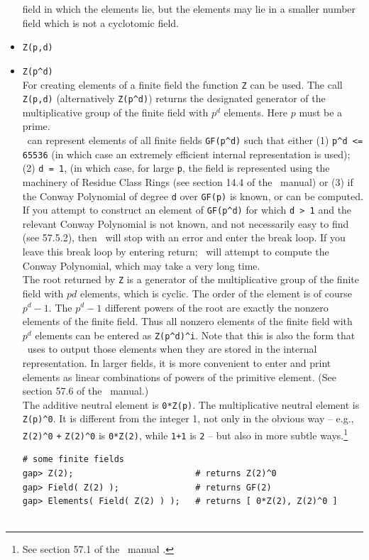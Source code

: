 \begin{itemize}
field in which the elements lie, but the elements may lie in a smaller number field
which is not a cyclotomic field. 
\item \verb.Z(p,d).
\item \verb.Z(p^d).\\
For creating elements of a finite field the function {\tt Z} can be used. The call
{\tt Z(p,d)} (alternatively \verb.Z(p^d).) returns the designated generator of the
multiplicative group of the finite field with $p^d$ elements. Here $p$ must be a prime.
\\[4pt]
\gap\ can represent elements of all finite fields \verb|GF(p^d)| such that
either (1) \verb|p^d <= 65536| (in which case an extremely efficient internal
representation is used); (2) {\tt d = 1}, (in which case, for large {\tt p}, the
field is represented using the machinery of Residue Class Rings (see section
14.4 of the \gap\ manual) or (3) if the Conway Polynomial of
degree {\tt d} over {\tt GF(p)} is known, or can be computed.
If you attempt to construct an element of \verb|GF(p^d)| 
for which \verb|d > 1| and the relevant Conway Polynomial
is not known, and not necessarily easy to find (see 57.5.2), 
then \gap\ will stop with an error and enter the break loop. If you leave this
break loop by entering return; \gap\ will attempt to compute the Conway 
Polynomial, which may take a very long time.
\\[4pt]
The root returned by {\tt Z} is a generator of the multiplicative group of the finite
field with $p d$ elements, which is cyclic. The order of the element is of course
$p^d-1$.  The $p^d-1$ different powers of the root are exactly the nonzero elements
of the finite field. Thus all nonzero elements of the finite field with $p^d$
elements can be entered as \verb.Z(p^d)^i.. Note that this is also the form that
\gap\ uses to output those elements when they are stored in the internal
representation. In larger fields, it is more convenient to enter and print elements
as linear combinations of powers of the  primitive element. 
(See section 57.6 of the \gap\ manual.)
\\[4pt]
The additive neutral element is {\tt 0*Z(p)}. 
The multiplicative neutral element is \verb.Z(p)^0.. 
It is different from the integer 1, not only in the obvious way -- e.g.,
\verb.Z(2)^0. {\tt +} \verb.Z(2)^0. is {\tt 0*Z(2)},  while {\tt 1+1} is {\tt 2} --
but also in 
more subtle ways.\footnote{See section 57.1 of the \gap\ manual \cite{gapmanual}.}
{\codesize
\begin{verbatim}
# some finite fields
gap> Z(2);                        # returns Z(2)^0
gap> Field( Z(2) );               # returns GF(2)
gap> Elements( Field( Z(2) ) );   # returns [ 0*Z(2), Z(2)^0 ]


\end{verbatim}}
\end{itemize}
